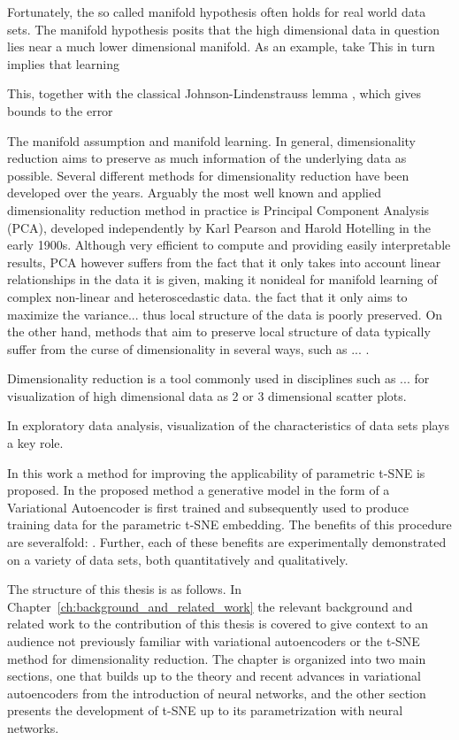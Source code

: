 Fortunately, the so called manifold hypothesis \cite{manifold_hypothesis} often holds for real world data sets. The manifold hypothesis posits that the high dimensional data in question lies near a much lower dimensional manifold. As an example, take This in turn implies that learning  

This, together with the classical Johnson-Lindenstrauss lemma \cite{johnson_lindenstrauss}, which gives bounds to the error 

The manifold assumption and manifold learning. In general, dimensionality reduction aims to preserve as much information of the underlying data as possible. Several different methods for dimensionality reduction have been developed over the years. Arguably the most well known and applied dimensionality reduction method in practice is Principal Component Analysis (PCA), developed independently by Karl Pearson \cite{pca_1} and Harold Hotelling \cite{pca_2} in the early 1900s. Although very efficient to compute and providing easily interpretable results, PCA however suffers from the fact that it only takes into account linear relationships in the data it is given, making it nonideal for manifold learning of complex non-linear and heteroscedastic data. the fact that it only aims to maximize the variance... thus local structure of the data is poorly preserved. On the other hand, methods that aim to preserve local structure of data typically suffer from the curse of dimensionality in several ways, such as ... .

Dimensionality reduction is a tool commonly used in disciplines such as ... for visualization of high dimensional data as 2 or 3 dimensional scatter plots. 

In exploratory data analysis, visualization of the characteristics of data sets plays a key role.

In this work a method for improving the applicability of parametric t-SNE is proposed. In the proposed method a generative model in the form of a Variational Autoencoder is first trained and subsequently used to produce training data for the parametric t-SNE embedding. The benefits of this procedure are severalfold: . Further, each of these benefits are experimentally demonstrated on a variety of data sets, both quantitatively and qualitatively.

The structure of this thesis is as follows. In Chapter~\ref{ch:background_and_related_work} the relevant background and related work to the contribution of this thesis is covered to give context to an audience not previously familiar with variational autoencoders or the t-SNE method for dimensionality reduction. The chapter is organized into two main sections, one that builds up to the theory and recent advances in variational autoencoders from the introduction of neural networks, and the other section presents the development of t-SNE up to its parametrization with neural networks.

